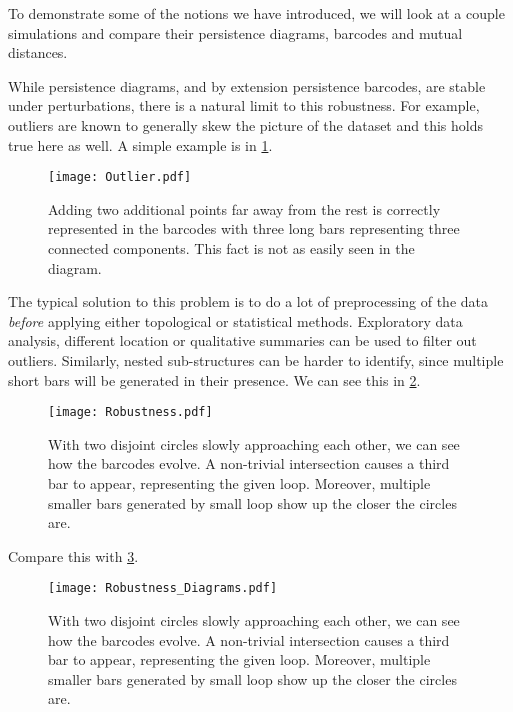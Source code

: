 To demonstrate some of the notions we have introduced, we will look at a couple simulations and compare their persistence diagrams, barcodes and mutual distances.

While persistence diagrams, and by extension persistence barcodes, are stable under perturbations, there is a natural limit to this robustness. For example, outliers are known to generally skew the picture of the dataset and this holds true here as well. A simple example is in \ref{fig:outlier}.

\begin{figure}[h!]
  \centering
  \texttt{[image: Outlier.pdf]}
  \caption{Adding two additional points far away from the rest is correctly represented in the barcodes with three long bars representing three connected components. This fact is not as easily seen in the diagram.}
  \label{fig:outlier}
\end{figure}

The typical solution to this problem is to do a lot of preprocessing of the data \textit{before} applying either topological or statistical methods. Exploratory data analysis, different location or qualitative summaries can be used to filter out outliers.
Similarly, nested sub-structures can be harder to identify, since multiple short bars will be generated in their presence. We can see this in \ref{fig:robust}.

\begin{figure}[h!]
  \centering
  \texttt{[image: Robustness.pdf]}
  \caption{With two disjoint circles slowly approaching each other, we can see how the barcodes evolve. A non-trivial intersection causes a third bar to appear, representing the given loop. Moreover, multiple smaller bars generated by small loop show up the closer the circles are.}
  \label{fig:robust}
\end{figure}

Compare this with \ref{fig:robust_diagrams}.

\begin{figure}[h!]
  \centering
  \texttt{[image: Robustness\_Diagrams.pdf]}
  \caption{With two disjoint circles slowly approaching each other, we can see how the barcodes evolve. A non-trivial intersection causes a third bar to appear, representing the given loop. Moreover, multiple smaller bars generated by small loop show up the closer the circles are.}
  \label{fig:robust_diagrams}
\end{figure}
